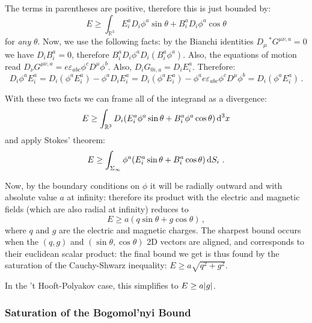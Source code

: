 \documentclass[main.tex]{subfiles}
\begin{document}
The terms in parentheses are positive, therefore this is just bounded by:
%
\begin{equation}
  E \geq \int_{\mathbb R^3}
  E_i^a D_i \phi^a \sin \theta+ B_i^a D_i \phi^a \cos \theta
\end{equation}
%
for \emph{any} \(\theta\).
Now, we use the following facts: by the Bianchi identities \(D_\mu \,^* G^{\mu\nu, a} = 0\) we have \(D_i B^a_i = 0\), therefore \(B_i^a D_i \phi^a  D_i(B_i^a \phi^a)\).
Also, the equations of motion read \(D_\nu G^{\mu\nu, a} = e \varepsilon_{abc} \phi^c D^\mu \phi^b\). Also, \(D_i G_{0i, a} = D_i E_i^a\).  Therefore:
%
\begin{equation}
  D_i \phi^a E_i^a
  = D_i (\phi ^a E_i^a) - \phi^a D_i E^a_i
  = D_i (\phi ^a E_i^a) - \phi^a e \varepsilon_{abc} \phi^c D^\mu \phi^b
  = D_i (\phi ^a E_i^a)\,.
\end{equation}

With these two facts we can frame all of the integrand as a divergence:
%
\begin{equation}
  E \geq \int_{\mathbb R^3}
  D_i \qty(E_i^a \phi^a \sin \theta+ B_i^a  \phi^a \cos \theta) \dd[3]{x}
\end{equation}
%
and apply Stokes' theorem:
%
\begin{equation}
  E \geq \int_{\Sigma_\infty}
  \phi^a \qty(E_i^a  \sin \theta+ B_i^a   \cos \theta ) \dd{S_i}\,.
\end{equation}

Now, by the boundary conditions on \(\phi\) it will be radially outward and with absolute value \(a\) at infinity: therefore its product with the electric and magnetic fields (which are also radial at infinity) reduces to
%
\begin{equation}
  E \geq a (q\sin \theta + g \cos \theta)\,,
\end{equation}
%
where \(q\) and \(g\) are the electric and magnetic charges.
The sharpest bound occurs when the \((q, g)\) and \((\sin \theta, \cos \theta)\)  2D vectors are aligned, and corresponds to their euclidean scalar product: the final bound we get is thus found by the saturation of the Cauchy-Shwarz inequality: \(E \geq a \sqrt{q^2 + g^2} \).

In the 't Hooft-Polyakov case, this simplifies to \(E \geq a \abs{g} \).

\subsubsection{Saturation of the Bogomol'nyi Bound}
\end{document}
